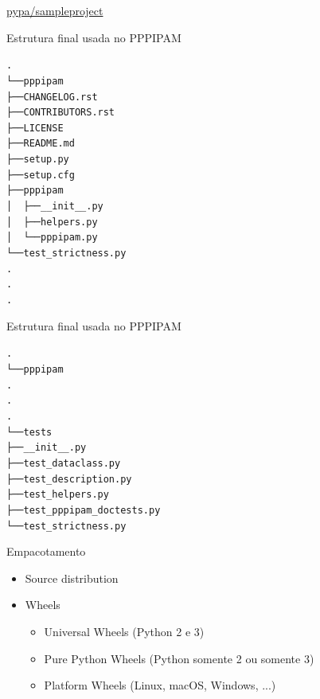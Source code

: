 \documentclass[11pt]{beamer}
\begin{document}
\begin{frame}[fragile]{\href{https://github.com/pypa/sampleproject}{pypa/sampleproject}}
  \hspace*{-.5cm}
\end{frame}

\begin{frame}[fragile]{Estrutura final usada no PPPIPAM}
\begin{alltt}\scriptsize
.
└── pppipam
    ├── CHANGELOG.rst
    ├── CONTRIBUTORS.rst
    ├── LICENSE
    ├── README.md
    ├── setup.py
    ├── setup.cfg
    ├── pppipam
    │   ├── __init__.py
    │   ├── helpers.py
    │   └── pppipam.py
        └── test_strictness.py
    .
    .
    .
\end{alltt}
\end{frame}

\begin{frame}[fragile]{Estrutura final usada no PPPIPAM}
\begin{alltt}\scriptsize
.
└── pppipam
    .
    .
    .
    └── tests
        ├── __init__.py
        ├── test_dataclass.py
        ├── test_description.py
        ├── test_helpers.py
        ├── test_pppipam_doctests.py
        └── test_strictness.py
\end{alltt}
\end{frame}

\begin{frame}[fragile]{Empacotamento}
  \begin{itemize}
    \item Source distribution
    \item Wheels
      \begin{itemize}
        \item Universal Wheels (Python 2 e 3)
        \item Pure Python Wheels (Python somente 2 ou somente 3)
        \item Platform Wheels (Linux, macOS, Windows, ...)
      \end{itemize}
  \end{itemize}
\end{frame}
\end{document}
